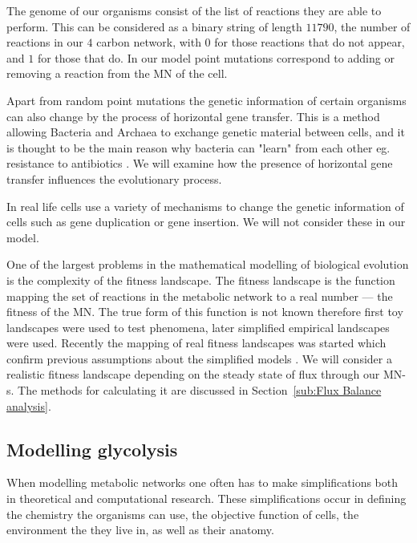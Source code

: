 \documentclass[a4paper,12pt]{article}
\begin{document}
	The genome of our organisms consist of the list of reactions they are able to perform. This can be considered as a binary string of length $11790$, the number of reactions in our $4$ carbon network, with $0$ for those reactions that do not appear, and $1$ for those that do. In our model point mutations correspond to adding or removing a reaction from the MN of the cell.

	Apart from random point mutations the genetic information of certain organisms can also change by the process of horizontal gene transfer. This is a method allowing Bacteria and Archaea to exchange genetic material between cells, and it is thought to be the main reason why bacteria can "learn" from each other eg. resistance to antibiotics \cite{horizontalAntibiotics,horizontalgenetransfer}. We will examine how the presence of horizontal gene transfer influences the evolutionary process.

	In real life cells use a variety of mechanisms to change the genetic information of cells such as gene duplication or gene insertion. We will not consider these in our model. 


	One of the largest problems in the mathematical modelling of biological evolution is the complexity of the fitness landscape. The fitness landscape is the function mapping the set of reactions in the metabolic network to a real number --- the fitness of the MN. The true form of this function is not known therefore first toy landscapes were used to test phenomena, later simplified empirical landscapes were used. Recently the mapping of real fitness landscapes was started which confirm previous assumptions about the simplified models \cite{fitnesslandscape}. We will consider a realistic fitness landscape depending on the steady state of flux through our MN-s. The methods for calculating it are discussed in Section~\ref{sub:Flux Balance analysis}.

	\subsection{Modelling glycolysis}
	\label{sub:artificial_chemistries}


	When modelling metabolic networks one often has to make simplifications both in theoretical and computational research. These simplifications occur in defining the chemistry the organisms can use, the objective function of cells, the environment the they live in, as well as their anatomy. %
	
\end{document}
